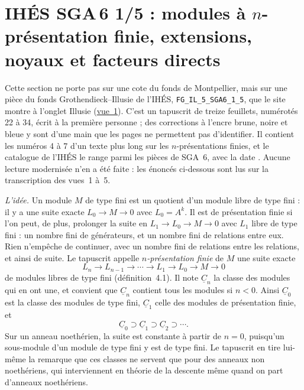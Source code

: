 \section[IHÉS SGA\,6 1/5 : modules à $n$-présentation finie]{IHÉS SGA\,6 1/5 : modules à $n$-présentation finie, extensions, noyaux et facteurs directs\protect{}}\label{sec:ihes-sga6-1-5}

Cette section ne porte pas sur une cote du fonds de Montpellier, mais sur une pièce du fonds Grothendieck--Illusie de l'IHÉS, \texttt{FG\_IL\_5\_SGA6\_1\_5}, que le site montre à l'onglet Illusie (\href{https://grothendieck.commutator.io/illusie/\#FG_IL_5_SGA6_1_5/1/p1}{vue~1}). C'est un tapuscrit de treize feuillets, numérotés 22 à 34, écrit à la première personne ; des corrections à l'encre brune, noire et bleue y sont d'une main que les pages ne permettent pas d'identifier. Il contient les numéros 4 à 7 d'un texte plus long sur les $n$-présentations finies, et le catalogue de l'IHÉS le range parmi les pièces de SGA~6, avec la date . Aucune lecture modernisée n'en a été faite : les énoncés ci-dessous sont lus sur la transcription des vues~1 à~5.

\emph{L'idée.} Un module $M$ de type fini est un quotient d'un module libre de type fini : il y a une suite exacte $L_0 \to M \to 0$ avec $L_0 = A^k$. Il est de présentation finie si l'on peut, de plus, prolonger la suite en $L_1 \to L_0 \to M \to 0$ avec $L_1$ libre de type fini : un nombre fini de générateurs, et un nombre fini de relations entre eux. Rien n'empêche de continuer, avec un nombre fini de relations entre les relations, et ainsi de suite. Le tapuscrit appelle \emph{$n$-présentation finie} de $M$ une suite exacte
\[
  L_n \to L_{n-1} \to \cdots \to L_1 \to L_0 \to M \to 0
\]
de modules libres de type fini (définition~4.1). Il note $\underline C_n$ la classe des modules qui en ont une, et convient que $\underline C_n$ contient tous les modules si $n < 0$. Ainsi $\underline C_0$ est la classe des modules de type fini, $\underline C_1$ celle des modules de présentation finie, et
\[
  \underline C_0 \supset \underline C_1 \supset \underline C_2 \supset \cdots .
\]
Sur un anneau noethérien, la suite est constante à partir de $n = 0$, puisqu'un sous-module d'un module de type fini y est de type fini. Le tapuscrit en tire lui-même la remarque que ces classes ne servent que pour des anneaux non noethériens, qui interviennent en théorie de la descente même quand on part d'anneaux noethériens.

